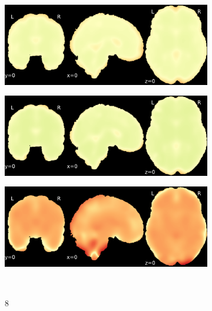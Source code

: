 \documentclass{article}
\begin{document}
\begin{appendices}
\begin{landscape}
\begin{figure}
\begin{subfigure}[t]{0.2\paperheight}
            \end{subfigure}
            \begin{subfigure}[t]{0.2\paperheight}
                \centering
                \includegraphics[width=\textwidth]{figures/sig/15mm/rr_ds002338_sub-xp201_sig.pdf}
            \end{subfigure}
            \begin{subfigure}[t]{0.2\paperheight}
                \centering
                \includegraphics[width=\textwidth]{figures/sig/15mm/rs_ds002338_sub-xp201_sig.pdf}
            \end{subfigure}
            \begin{subfigure}[t]{0.2\paperheight}
                \centering
                \includegraphics[width=\textwidth]{figures/sig/15mm/rr.rs_ds002338_sub-xp201_sig.pdf}
            \end{subfigure} \\
            \begin{subfigure}[b][][c]{0.01\paperwidth} 8 \vspace*{15pt} \end{subfigure}

\end{figure}
\end{landscape}
\end{appendices}
\end{document}
